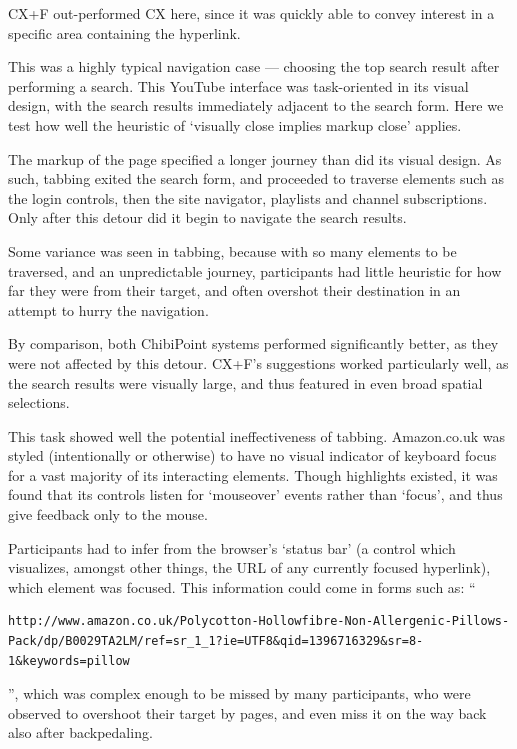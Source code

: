 \documentclass[a4paper, 12pt]{report}
\begin{document}
CX+F out-performed CX here, since it was quickly able to convey interest in a specific area containing the hyperlink.

This was a highly typical navigation case --- choosing the top search result after performing a search. This YouTube interface was task-oriented in its visual design, with the search results immediately adjacent to the search form. Here we test how well the heuristic of `visually close implies markup close' applies.

The markup of the page specified a longer journey than did its visual design. As such, tabbing exited the search form, and proceeded to traverse elements such as the login controls, then the site navigator, playlists and channel subscriptions. Only after this detour did it begin to navigate the search results.

Some variance was seen in tabbing, because with so many elements to be traversed, and an unpredictable journey, participants had little heuristic for how far they were from their target, and often overshot their destination in an attempt to hurry the navigation.

By comparison, both ChibiPoint systems performed significantly better, as they were not affected by this detour. CX+F's suggestions worked particularly well, as the search results were visually large, and thus featured in even broad spatial selections.

This task showed well the potential ineffectiveness of tabbing. Amazon.co.uk was styled (intentionally or otherwise) to have no visual indicator of keyboard focus for a vast majority of its interacting elements. Though highlights existed, it was found that its controls listen for `mouseover' events rather than `focus', and thus give feedback only to the mouse.

Participants had to infer from the browser's `status bar' (a control which visualizes, amongst other things, the URL of any currently focused hyperlink), which element was focused. This information could come in forms such as: ``\begin{verbatim}http://www.amazon.co.uk/Polycotton-Hollowfibre-Non-Allergenic-Pillows-Pack/dp/B0029TA2LM/ref=sr_1_1?ie=UTF8&qid=1396716329&sr=8-1&keywords=pillow\end{verbatim}'', which was complex enough to be missed by many participants, who were observed to overshoot their target by pages, and even miss it on the way back also after backpedaling.
\end{document}
